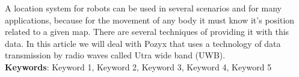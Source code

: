 \begin{thesisabastract}

A location system for robots can be used in several scenarios and for many applications, because for the movement of any body it must know it's position related to a given map. There are several techniques of providing it with this data. In this article we will deal with Pozyx that uses a technology of data transmission by radio waves called Utra wide band (UWB).
\ \\


\textbf{Keywords}: Keyword 1, Keyword 2, Keyword 3, Keyword 4, Keyword 5

\end{thesisabastract}
